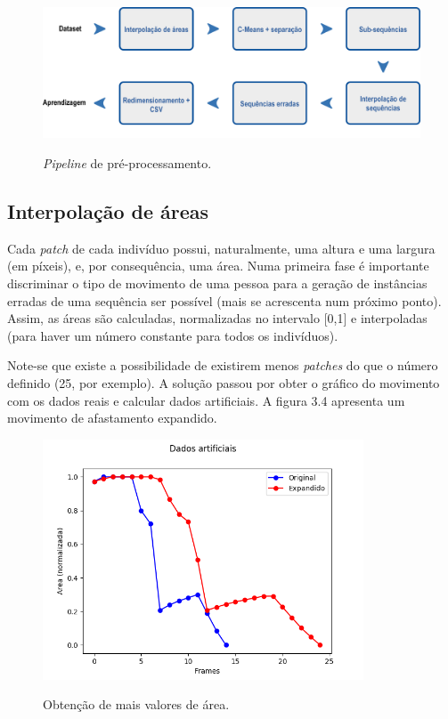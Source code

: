 \begin{figure}[h]
    \centering
    \includegraphics[width=380pt]{pipeline.png}
    \label{fig:pipeline}
    \caption{\textit{Pipeline} de pré-processamento.}
    \end{figure}

\subsection{Interpolação de áreas}
\label{chap3:subsec:areas}
Cada \textit{patch} de cada indivíduo possui, naturalmente, uma altura e uma largura (em píxeis), e, por consequência, uma área. Numa primeira fase é importante discriminar o tipo de movimento de uma pessoa para a geração de instâncias erradas de uma sequência ser possível (mais se acrescenta num próximo ponto). Assim, as áreas são calculadas, normalizadas no intervalo [0,1] e interpoladas (para haver um número constante para todos os indivíduos). 

\noindent Note-se que existe a possibilidade de existirem menos \textit{patches} do que o número definido (25, por exemplo). A solução passou por obter o gráfico do movimento com os dados reais e calcular dados artificiais. A figura 3.4 apresenta um movimento de afastamento expandido.
    
\begin{figure}[h]
\centering
\includegraphics[width=270pt]{interpolada.png}
\label{fig:dados_artificiais_foto}
\caption{Obtenção de mais valores de área.}
\end{figure}


